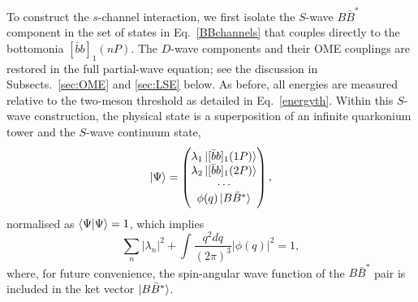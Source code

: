 \documentclass[aps,prd,showpacs,amsmath,twocolumn,superscriptaddress,floatfix,nofootinbib,notitlepage]{revtex4-2}
\newcommand{\bbnP}{[\bar{b}b]_1(nP)}
\newcommand{\bbarb}{[\bar{b}b]_1}
\newcommand{\be}{\begin{equation}}
\newcommand{\ee}{\end{equation}}
\begin{document}
To construct the $s$-channel interaction, we first isolate the $S$-wave $B\bar{B}^*$ component in the set of states in Eq.~\eqref{BBchannels} that couples directly to the bottomonia ${\bbnP}$. The $D$-wave components and their OME couplings are restored in the full partial-wave equation; see the discussion in Subsects.~\ref{sec:OME} and \ref{sec:LSE} below. 
As before, all energies are measured relative to the two-meson threshold as detailed in Eq.~\eqref{energyth}. Within this $S$-wave construction, the physical state is a superposition of an infinite quarkonium tower and the $S$-wave continuum state,
\be
|\Psi\rangle=
\begin{pmatrix}
\lambda_1\ket{\bbarb(1P)}\\ \lambda_2\ket{\bbarb(2P)}\\ \cdots\\ \phi(q)\ket{B\bar{B}^*}
\end{pmatrix},
\label{state}
\ee
normalised as $\braket{\Psi|\Psi}=1$, which implies
\be
\sum_n|\lambda_n|^2+\int\frac{q^2dq}{(2\pi)^3}|\phi(q)|^2=1,
\label{eq:state-normalisation}
\ee
where, for future convenience, the spin-angular wave function of the $B\bar{B}^*$ pair is included in the ket vector $\ket{B\bar{B}^*}$.
\end{document}
